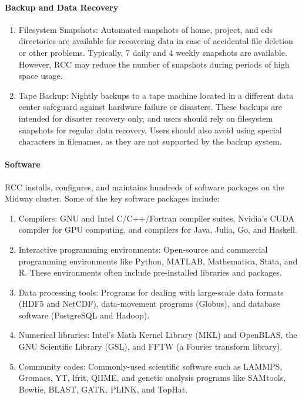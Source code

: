\paragraph*{Backup and Data Recovery}
\begin{enumerate}

\item  Filesystem Snapshots: Automated snapshots of home, project, and cds directories are available for recovering data in case of accidental file deletion or other problems. Typically, 7 daily and 4 weekly snapshots are available. However, RCC may reduce the number of snapshots during periods of high space usage.

\item  Tape Backup: Nightly backups to a tape machine located in a different data center safeguard against hardware failure or disasters. These backups are intended for disaster recovery only, and users should rely on filesystem snapshots for regular data recovery. Users should also avoid using special characters in filenames, as they are not supported by the backup system.
\end{enumerate}

\paragraph*{Software}

RCC installs, configures, and maintains hundreds of software packages on the Midway cluster. Some of the key software packages include:
\begin{enumerate}

\item  Compilers: GNU and Intel C/C++/Fortran compiler suites, Nvidia's CUDA compiler for GPU computing, and compilers for Java, Julia, Go, and Haskell.

\item  Interactive programming environments: Open-source and commercial programming environments like Python, MATLAB, Mathematica, Stata, and R. These environments often include pre-installed libraries and packages.

\item  Data processing tools: Programs for dealing with large-scale data formats (HDF5 and NetCDF), data-movement programs (Globus), and database software (PostgreSQL and Hadoop).

\item  Numerical libraries: Intel's Math Kernel Library (MKL) and OpenBLAS, the GNU Scientific Library (GSL), and FFTW (a Fourier transform library).

\item  Community codes: Commonly-used scientific software such as LAMMPS, Gromacs, YT, lfrit, QIIME, and genetic analysis programs like SAMtools, Bowtie, BLAST, GATK, PLINK, and TopHat.
\end{enumerate}

